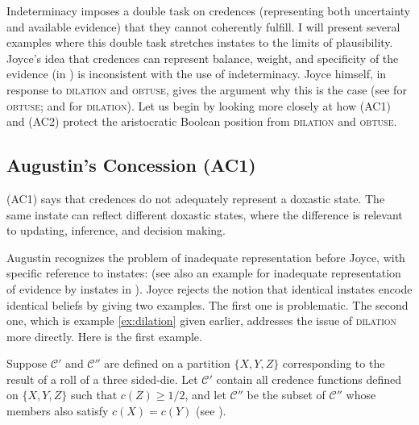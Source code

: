 \documentclass[12pt]{article}
\begin{document}
Indeterminacy imposes a double task on credences (representing both
uncertainty and available evidence) that they cannot coherently
fulfill. I will present several examples where this double task
stretches instates to the limits of plausibility. Joyce's idea that
credences can represent balance, weight, and specificity of the
evidence (in ) is inconsistent with the use of
indeterminacy. Joyce himself, in response to \textsc{dilation} and
\textsc{obtuse}, gives the argument why this is the case (see
 for \textsc{obtuse}; and
 for \textsc{dilation}). Let us
begin by looking more closely at how (AC1) and (AC2) protect the
aristocratic Boolean position from \textsc{dilation} and
\textsc{obtuse}.

\subsection{Augustin's Concession (AC1)}
\label{jj1}

(AC1) says that credences do not adequately represent a doxastic
state. The same instate can reflect different doxastic states, where
the difference is relevant to updating, inference, and decision
making.

Augustin recognizes the problem of inadequate representation before
Joyce, with specific reference to instates:   (see also an example for
inadequate representation of evidence by instates in
). Joyce rejects the notion that
identical instates encode identical beliefs by giving two examples.
The first one is problematic. The second one, which is example
\ref{ex:dilation} given earlier, addresses the issue of
\textsc{dilation} more directly. Here is the first example.

\begin{quotex}
  \label{ex:die} Suppose $\mathcal{C}'$ and
  $\mathcal{C}''$ are defined on a partition $\{X,Y,Z\}$ corresponding
  to the result of a roll of a three sided-die. Let $\mathcal{C}'$
  contain all credence functions defined on $\{X,Y,Z\}$ such that
  $c(Z)\geq1/2$, and let $\mathcal{C}''$ be the subset of
  $\mathcal{C}''$ whose members also satisfy $c(X)=c(Y)$ (see
  ).
\end{quotex}
\end{document}
